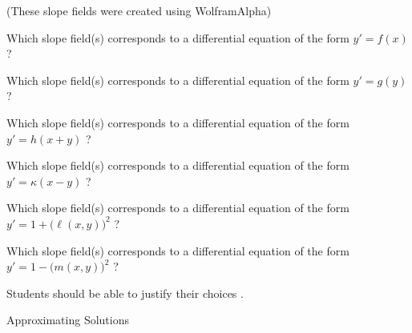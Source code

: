\hfill {\footnotesize(These slope fields were created using WolframAlpha)} \\


\begin{parts}
	\item Which slope field(s) corresponds to a differential equation of the form
		\qquad $y'=f(x)$ \qquad ?	

	\item Which slope field(s) corresponds to a differential equation of the form
		\qquad $y'=g(y)$ \qquad ?	

	\item Which slope field(s) corresponds to a differential equation of the form
		\qquad $y'=h(x+y)$ \qquad ?	

	\item Which slope field(s) corresponds to a differential equation of the form
		\qquad $y'=\kappa(x-y)$ \qquad ?	

	\item Which slope field(s) corresponds to a differential equation of the form
		\qquad $y'=1+\big( \ell(x,y) \big)^2$ \qquad ?	

	\item Which slope field(s) corresponds to a differential equation of the form
		\qquad $y'=1-\big( m(x,y) \big)^2$ \qquad ?	

\end{parts}

\begin{annotation}
	\begin{Goals}
		Students should be able to justify their choices	.
	\end{Goals}
	
\end{annotation}






\newpage






%
%



\begin{module}{Approximating Solutions}
	\label{Approximation}

	
	
\end{module}



